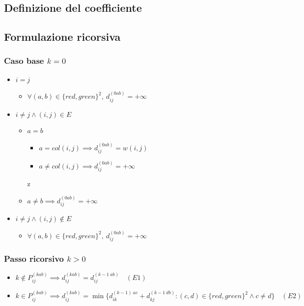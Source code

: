\subsection{Definizione del coefficiente}

\newpage
\subsection{Formulazione ricorsiva}
\subsubsection{Caso base $k=0$}
\begin{itemize}
    \item $i = j$
    \begin{itemize}
        \item $\forall (a,b) \in \{red, green\}^2,\ d_{ij}^{(0ab)} = +\infty$
    \end{itemize}

    \item $i \not = j \land (i,j) \in E$
    \begin{itemize}
        \item $a = b$
        \begin{itemize}
            \item $a = col(i,j) \implies d_{ij}^{(0ab)} = w(i,j)$
            \item $a \not = col(i,j) \implies d_{ij}^{(0ab)} = +\infty$
        \end{itemize}z
        \item $a \not = b \implies d_{ij}^{(0ab)} = + \infty$
    \end{itemize}

    \item $i \not = j \land (i,j) \not \in E$
    \begin{itemize}
        \item $\forall (a,b) \in \{red, green\}^2,\ d_{ij}^{(0ab)} = + \infty$
    \end{itemize}
\end{itemize}

\subsubsection{Passo ricorsivo $k > 0$}
\begin{itemize}
    \item $k \not \in P_{ij}^{(kab)} \implies d_{ij}^{(kab)} = d_{ij}^{(k-1\ ab)} \quad (E1)$
    \item $k \in P_{ij}^{(kab)} \implies d_{ij}^{(kab)} = \min\{d_{ik}^{(k-1)\ ac} + d_{kj}^{(k-1\ db)} : (c,d) \in \{red, green\}^2 \land c \not = d\} \quad (E2)$
\end{itemize}


